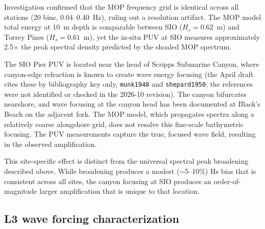 Investigation confirmed that the MOP frequency grid is identical across
all stations (20 bins, 0.04--0.40~Hz), ruling out a resolution artifact.
The MOP model total energy at 10~m depth is comparable between SIO
($H_s = 0.62$~m) and Torrey Pines ($H_s = 0.61$~m), yet the in-situ
PUV at SIO measures approximately 2.5$\times$ the peak spectral density
predicted by the shoaled MOP spectrum.

The SIO Pier PUV is located near the head of Scripps Submarine Canyon,
where canyon-edge refraction is known to create wave energy focusing
(the April draft cites these by bibliography key only, \texttt{munk1948} and
\texttt{shepard1950}; the references were not identified or checked in the 2026-10
revision). The canyon bifurcates nearshore,
and wave focusing at the canyon head has been documented at Black's
Beach on the adjacent fork. The MOP model, which propagates spectra
along a relatively coarse alongshore grid, does not resolve this
fine-scale bathymetric focusing. The PUV measurements capture the true,
focused wave field, resulting in the observed amplification.


This site-specific effect is distinct from the universal spectral peak
broadening described above. While broadening produces a modest
($\sim$5--10\%) Hs bias that is consistent across all sites, the
canyon focusing at SIO produces an order-of-magnitude larger
amplification that is unique to that location.

\subsection{L3 wave forcing characterization}


